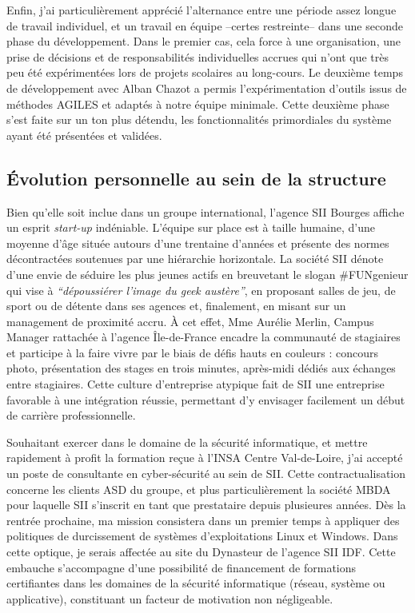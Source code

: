   Enfin, j'ai particulièrement apprécié l'alternance entre une période assez longue de travail individuel, et un travail en équipe --certes restreinte-- dans une seconde phase du développement. 
  Dans le premier cas, cela force à une organisation, une prise de décisions et de responsabilités individuelles accrues qui n'ont que très peu été expérimentées lors de projets scolaires au long-cours.
  Le deuxième temps de développement avec Alban Chazot a permis l'expérimentation d'outils issus de méthodes AGILES et adaptés à notre équipe minimale.  
  Cette deuxième phase s'est faite sur un ton plus détendu, les fonctionnalités primordiales du système ayant été présentées et validées. 
  
  \subsection{\'{E}volution personnelle au sein de la structure}
  
  Bien qu'elle soit inclue dans un groupe international, l'agence SII Bourges affiche un esprit \emph{start-up} indéniable. 
  L'équipe sur place est à taille humaine, d'une moyenne d'âge située autours d'une trentaine d'années et présente des normes décontractées soutenues par une hiérarchie horizontale.
  La société SII dénote d'une envie de séduire les plus jeunes actifs en breuvetant le slogan \#FUNgenieur qui vise à \emph{``dépoussiérer l'image du geek austère''}, en proposant salles de jeu, de sport ou de détente dans ses agences et, 
  finalement, en misant sur un management de proximité accru.
  \`{A} cet effet, Mme Aurélie Merlin, Campus Manager rattachée à l'agence Île-de-France encadre la communauté de stagiaires et participe à la faire vivre par le biais de défis hauts en couleurs : concours photo, présentation 
  des stages en trois minutes, après-midi dédiés aux échanges entre stagiaires. 
  Cette culture d'entreprise atypique fait de SII une entreprise favorable à une intégration réussie, permettant d'y envisager facilement un début de carrière professionnelle. 
  
  Souhaitant exercer dans le domaine de la sécurité informatique, et mettre rapidement à profit la formation reçue à l'INSA Centre Val-de-Loire, j'ai accepté un poste de consultante en cyber-sécurité au sein de SII.
  Cette contractualisation concerne les clients \gls{ASD} du groupe, et plus particulièrement la société MBDA pour laquelle SII s'inscrit en tant que prestataire depuis plusieures années. 
  Dès la rentrée prochaine, ma mission consistera dans un premier temps à appliquer des politiques de durcissement de systèmes d'exploitations Linux et Windows. 
  Dans cette optique, je serais affectée au site du Dynasteur de l'agence SII \gls{IDF}. 
  Cette embauche s'accompagne d'une possibilité de financement de formations certifiantes dans les domaines de la sécurité informatique (réseau, système ou applicative), constituant un facteur de motivation non négligeable.  
  